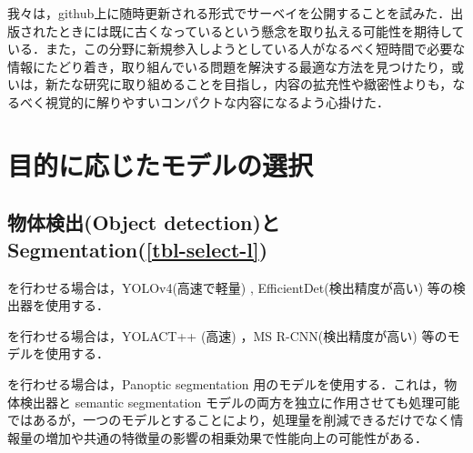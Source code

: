 \documentclass[originalpaper,fleqn]{jsaiart}     %
\begin{document}
我々は，github上に随時更新される形式でサーベイを公開することを試みた．出版されたときには既に古くなっているという懸念を取り払える可能性を期待している．また，この分野に新規参入しようとしている人がなるべく短時間で必要な情報にたどり着き，取り組んでいる問題を解決する最適な方法を見つけたり，或いは，新たな研究に取り組めることを目指し，内容の拡充性や緻密性よりも，なるべく視覚的に解りやすいコンパクトな内容になるよう心掛けた．

\section{目的に応じたモデルの選択}
\subsection{物体検出(Object detection)と Segmentation(\ref{tbl-select-l})}
を行わせる場合は，YOLOv4(高速で軽量) \cite{BWL20}, EfficientDet(検出精度が高い) \cite{TPL20}等の検出器を使用する．

を行わせる場合は，YOLACT++ (高速) \cite{BZXL20}，MS R-CNN(検出精度が高い) \cite{HHGHW19} 等のモデルを使用する．

を行わせる場合は，Panoptic segmentation 用のモデル\cite{KHGRD19}を使用する．これは，物体検出器と semantic segmentation モデルの両方を独立に作用させても処理可能ではあるが，一つのモデルとすることにより，処理量を削減できるだけでなく情報量の増加や共通の特徴量の影響の相乗効果で性能向上の可能性がある．
\end{document}
